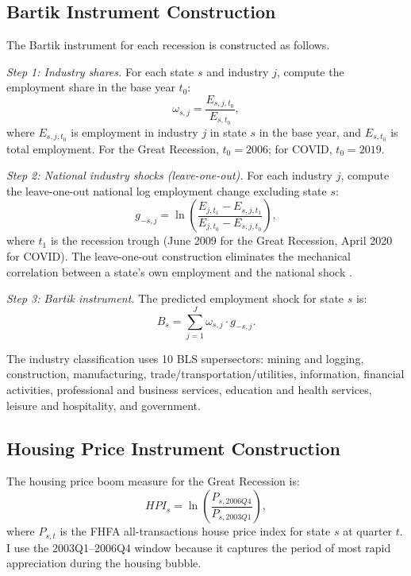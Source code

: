 \documentclass[12pt]{article}
\begin{document}
\subsection{Bartik Instrument Construction}

The Bartik instrument for each recession is constructed as follows.

\textit{Step 1: Industry shares.} For each state $s$ and industry $j$, compute the employment share in the base year $t_0$:
\begin{equation}
\omega_{s,j} = \frac{E_{s,j,t_0}}{E_{s,t_0}},
\label{eq:app_bartik_share}
\end{equation}
where $E_{s,j,t_0}$ is employment in industry $j$ in state $s$ in the base year, and $E_{s,t_0}$ is total employment. For the Great Recession, $t_0 = 2006$; for COVID, $t_0 = 2019$.

\textit{Step 2: National industry shocks (leave-one-out).} For each industry $j$, compute the leave-one-out national log employment change excluding state $s$:
\begin{equation}
g_{-s,j} = \ln\left(\frac{E_{j,t_1} - E_{s,j,t_1}}{E_{j,t_0} - E_{s,j,t_0}}\right),
\label{eq:app_bartik_shock}
\end{equation}
where $t_1$ is the recession trough (June 2009 for the Great Recession, April 2020 for COVID). The leave-one-out construction eliminates the mechanical correlation between a state's own employment and the national shock \citep{goldsmith2020bartik}.

\textit{Step 3: Bartik instrument.} The predicted employment shock for state $s$ is:
\begin{equation}
B_s = \sum_{j=1}^{J} \omega_{s,j} \cdot g_{-s,j}.
\label{eq:app_bartik}
\end{equation}

The industry classification uses 10 BLS supersectors: mining and logging, construction, manufacturing, trade/transportation/utilities, information, financial activities, professional and business services, education and health services, leisure and hospitality, and government.

\subsection{Housing Price Instrument Construction}

The housing price boom measure for the Great Recession is:
\begin{equation}
HPI_s = \ln\left(\frac{P_{s,2006Q4}}{P_{s,2003Q1}}\right),
\label{eq:app_hpi}
\end{equation}
where $P_{s,t}$ is the FHFA all-transactions house price index for state $s$ at quarter $t$. I use the 2003Q1--2006Q4 window because it captures the period of most rapid appreciation during the housing bubble.
\end{document}
